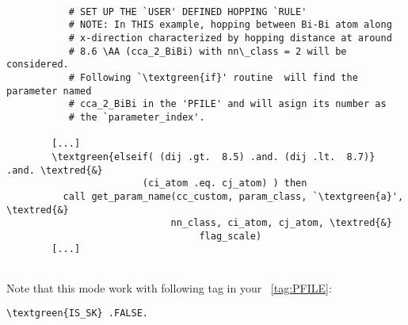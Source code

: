 \documentclass[a4paper,12pt]{scrartcl}
\newcommand{\textred}[1]{\textcolor{red!85!white}{\texttt{#1}}}
\newcommand{\textgreen}[1]{\textcolor{green!50!black}{\texttt{#1}}}
\begin{document}
\begin{description}
\begin{Verbatim}[commandchars=\\\{\},gobble=4, frame=single, framesep=2mm, 
    label= source code example: get\_cc\_param.f90,
    labelposition=bottomline]

		   # SET UP THE `USER' DEFINED HOPPING `RULE'
		   # NOTE: In THIS example, hopping between Bi-Bi atom along 
		   # x-direction characterized by hopping distance at around 
		   # 8.6 \AA (cca_2_BiBi) with nn\_class = 2 will be considered.
		   # Following `\textgreen{if}' routine  will find the parameter named 
		   # cca_2_BiBi in the 'PFILE' and will asign its number as 
		   # the `parameter_index'.

	   	[...]
        \textgreen{elseif( (dij .gt.  8.5) .and. (dij .lt.  8.7)} .and. \textred{&}
					    (ci_atom .eq. cj_atom) ) then 
    	  call get_param_name(cc_custom, param_class, `\textgreen{a}', \textred{&} 
			  			     nn_class, ci_atom, cj_atom, \textred{&}
							      flag_scale)
	   	[...]


\end{Verbatim}

		Note that this mode work with following tag in your ~\ref{tag:PFILE}:
		\begin{Verbatim}[commandchars=\\\{\}]
	 \textgreen{IS_SK} .FALSE.
		\end{Verbatim}
		

\end{description}
\end{document}
